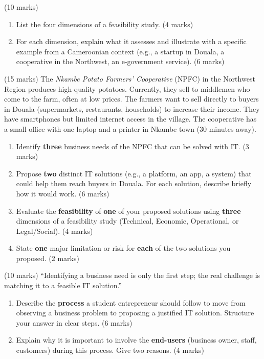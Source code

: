 \documentclass[11pt]{article}
\newcounter{popsec}
\newcounter{popsub}
\newcommand{\courssub}[1]{%
  \stepcounter{popsub}%
  \par\vspace{9pt}\noindent{\popxbold\fontsize{11.5}{13}\selectfont\color{popink}{\color{poporange}\thepopsec.\thepopsub}\hspace{6pt}#1}\par\nopagebreak\vspace{4pt}
}
\begin{document}
\courssub{I prepare for the GCE}

\begin{exercice} (10 marks)
\begin{enumerate}
\item List the four dimensions of a feasibility study. (4 marks)
\item For each dimension, explain what it assesses and illustrate with a specific example from a Cameroonian context (e.g., a startup in Douala, a cooperative in the Northwest, an e-government service). (6 marks)
\end{enumerate}
\end{exercice}

\begin{exercice} (15 marks)
The \emph{Nkambe Potato Farmers' Cooperative} (NPFC) in the Northwest Region produces high-quality potatoes. Currently, they sell to middlemen who come to the farm, often at low prices. The farmers want to sell directly to buyers in Douala (supermarkets, restaurants, households) to increase their income. They have smartphones but limited internet access in the village. The cooperative has a small office with one laptop and a printer in Nkambe town (30 minutes away).
\begin{enumerate}
\item Identify \textbf{three} business needs of the NPFC that can be solved with IT. (3 marks)
\item Propose \textbf{two} distinct IT solutions (e.g., a platform, an app, a system) that could help them reach buyers in Douala. For each solution, describe briefly how it would work. (6 marks)
\item Evaluate the \textbf{feasibility} of \textbf{one} of your proposed solutions using \textbf{three} dimensions of a feasibility study (Technical, Economic, Operational, or Legal/Social). (4 marks)
\item State \textbf{one} major limitation or risk for \textbf{each} of the two solutions you proposed. (2 marks)
\end{enumerate}
\end{exercice}

\begin{exercice} (10 marks)
``Identifying a business need is only the first step; the real challenge is matching it to a feasible IT solution.''
\begin{enumerate}
\item Describe the \textbf{process} a student entrepreneur should follow to move from observing a business problem to proposing a justified IT solution. Structure your answer in clear steps. (6 marks)
\item Explain why it is important to involve the \textbf{end-users} (business owner, staff, customers) during this process. Give two reasons. (4 marks)
\end{enumerate}
\end{exercice}
\end{document}
